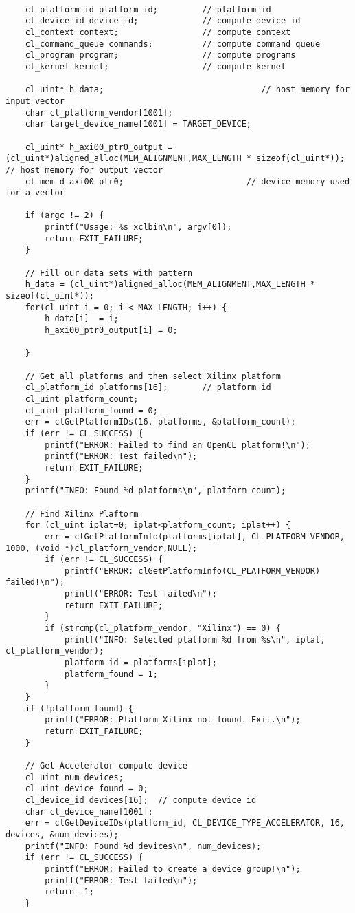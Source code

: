 \begin{lstlisting}[label=lst:lev_rec,caption=Содержимое файла host\_example.cpp]
	
	cl_platform_id platform_id;         // platform id
	cl_device_id device_id;             // compute device id
	cl_context context;                 // compute context
	cl_command_queue commands;          // compute command queue
	cl_program program;                 // compute programs
	cl_kernel kernel;                   // compute kernel
	
	cl_uint* h_data;                                // host memory for input vector
	char cl_platform_vendor[1001];
	char target_device_name[1001] = TARGET_DEVICE;
	
	cl_uint* h_axi00_ptr0_output = (cl_uint*)aligned_alloc(MEM_ALIGNMENT,MAX_LENGTH * sizeof(cl_uint*)); // host memory for output vector
	cl_mem d_axi00_ptr0;                         // device memory used for a vector
	
	if (argc != 2) {
		printf("Usage: %s xclbin\n", argv[0]);
		return EXIT_FAILURE;
	}
	
	// Fill our data sets with pattern
	h_data = (cl_uint*)aligned_alloc(MEM_ALIGNMENT,MAX_LENGTH * sizeof(cl_uint*));
	for(cl_uint i = 0; i < MAX_LENGTH; i++) {
		h_data[i]  = i;
		h_axi00_ptr0_output[i] = 0; 
		
	}
	
	// Get all platforms and then select Xilinx platform
	cl_platform_id platforms[16];       // platform id
	cl_uint platform_count;
	cl_uint platform_found = 0;
	err = clGetPlatformIDs(16, platforms, &platform_count);
	if (err != CL_SUCCESS) {
		printf("ERROR: Failed to find an OpenCL platform!\n");
		printf("ERROR: Test failed\n");
		return EXIT_FAILURE;
	}
	printf("INFO: Found %d platforms\n", platform_count);
	
	// Find Xilinx Plaftorm
	for (cl_uint iplat=0; iplat<platform_count; iplat++) {
		err = clGetPlatformInfo(platforms[iplat], CL_PLATFORM_VENDOR, 1000, (void *)cl_platform_vendor,NULL);
		if (err != CL_SUCCESS) {
			printf("ERROR: clGetPlatformInfo(CL_PLATFORM_VENDOR) failed!\n");
			printf("ERROR: Test failed\n");
			return EXIT_FAILURE;
		}
		if (strcmp(cl_platform_vendor, "Xilinx") == 0) {
			printf("INFO: Selected platform %d from %s\n", iplat, cl_platform_vendor);
			platform_id = platforms[iplat];
			platform_found = 1;
		}
	}
	if (!platform_found) {
		printf("ERROR: Platform Xilinx not found. Exit.\n");
		return EXIT_FAILURE;
	}
	
	// Get Accelerator compute device
	cl_uint num_devices;
	cl_uint device_found = 0;
	cl_device_id devices[16];  // compute device id
	char cl_device_name[1001];
	err = clGetDeviceIDs(platform_id, CL_DEVICE_TYPE_ACCELERATOR, 16, devices, &num_devices);
	printf("INFO: Found %d devices\n", num_devices);
	if (err != CL_SUCCESS) {
		printf("ERROR: Failed to create a device group!\n");
		printf("ERROR: Test failed\n");
		return -1;
	}
	

\end{lstlisting}
